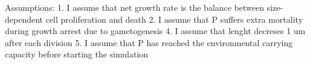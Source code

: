 \documentclass[a4paper,oneside]{book}
\begin{document}
Assumptions: 
1. I assume that net growth rate is the balance between size-dependent cell proliferation and death
2. I assume that P suffers extra mortality during growth arrest due to gametogenesis
4. I assume that lenght decreses 1 um after each division
5. I assume that P has reached the environmental carrying capacity before starting the simulation
\end{document}
